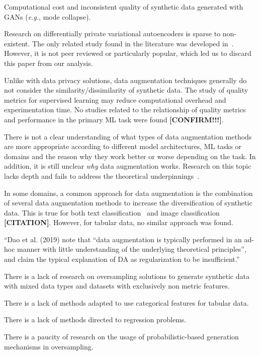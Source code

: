 \documentclass[parskip=full]{scrartcl}
\begin{document}
Computational cost and inconsistent quality of synthetic data generated with
GANs (\textit{e.g.}, mode collapse).

Research on differentially private variational autoencoders is sparse to
non-existent. The only related study found in the literature was developed
in~\cite{takahashi2020differentially}. However, it is not peer reviewed or
particularly popular, which led us to discard this paper from our analysis.

Unlike with data privacy solutions, data augmentation techniques generally do
not consider the similarity/dissimilarity of synthetic data. The study of
quality metrics for supervised learning may reduce computational overhead and
experimentation time. No studies related to the relationship of quality
metrics and performance in the primary ML task were found
\textbf{[CONFIRM!!!]}.

There is not a clear understanding of what types of data augmentation methods
are more appropriate according to different model architectures, ML tasks or
domains and the reason why they work better or worse depending on the task. 
In addition, it is still unclear \textit{why} data augmentation works.
Research on this topic lacks depth and fails to address the theoretical
underpinnings~\cite{feng2021survey}.

In some domains, a common approach for data augmentation is the combination of
several data augmentation methods to increase the diversification of synthetic
data. This is true for both text classification~\cite{bayer2021survey} and
image classification \textbf{[CITATION]}.  However, for tabular data, no
similar approach was found.


``Dao et al. (2019) note that ``data augmentation is typically performed in an
ad-hoc manner with little understanding of the underlying theoretical
principles'', and claim the typical explanation of DA as regularization to be
insufficient.''~\cite{feng2021survey}

There is a lack of research on oversampling solutions to generate synthetic
data with mixed data types and datasets with exclusively non metric features.

There is a lack of methods adapted to use categorical features for tabular
data.

There is a lack of methods directed to regression problems.

There is a paucity of research on the usage of probabilistic-based generation
mechanisms in oversampling.
\end{document}
